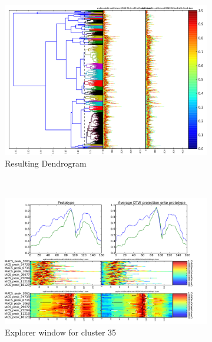 \documentclass[parskip]{cs4rep}
\begin{document}
\begin{figure}
    \centering
    \begin{subfigure}[b]{0.45\textwidth}
         \includegraphics[width=\textwidth]{figures/evaluation/macs-peaks/cut-no-preview-button.png}
         \caption{Resulting Dendrogram}
         \label{fig:evaluation:macs-peaks:cut}
    \end{subfigure}
    ~
    \begin{subfigure}[b]{0.5\textwidth}
        \centering
        \includegraphics[width=\textwidth]{figures/evaluation/macs-peaks/dgw-explorer-cluster-35.png}
        \caption{Explorer window for cluster 35}
        \label{fig:evaluation:macs-peaks:explorer}
    \end{subfigure}
    ~
    \begin{subfigure}[b]{0.8\textwidth}

\end{subfigure}
\end{figure}
\end{document}

